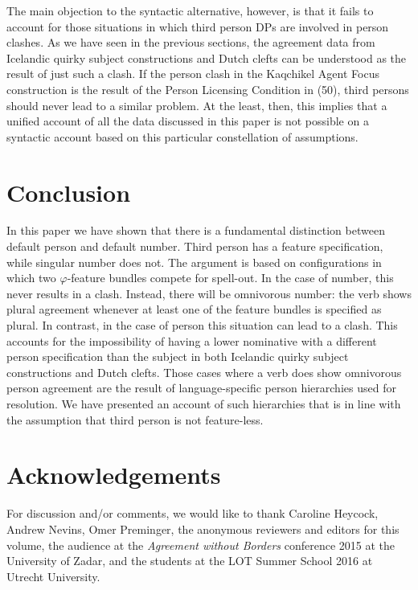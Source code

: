 \documentclass[output=paper]{langsci/langscibook}
\begin{document}
  The main objection to the syntactic alternative, however, is that it fails to account for those situations in which third person DPs are involved in person clashes. As we have seen in the previous sections, the agreement data from Icelandic quirky subject constructions and Dutch clefts can be understood as the result of just such a clash. If the person clash in the Kaqchikel Agent Focus construction is the result of the Person Licensing Condition in (50), third persons should never lead to a similar problem. At the least, then, this implies that a unified account of all the data discussed in this paper is not possible on a syntactic account based on this particular constellation of assumptions.

\section{Conclusion}
In this paper we have shown that there is a fundamental distinction between default person and default number. Third person has a feature specification, while singular number does not. The argument is based on configurations in which two $\varphi $-feature bundles compete for spell-out. In the case of number, this never results in a clash. Instead, there will be omnivorous number: the verb shows plural agreement whenever at least one of the feature bundles is specified as plural. In contrast, in the case of person this situation can lead to a clash. This accounts for the impossibility of having a lower nominative with a different person specification than the subject in both Icelandic quirky subject constructions and Dutch clefts. Those cases where a verb does show omnivorous person agreement are the result of language-specific person hierarchies used for resolution. We have presented an account of such hierarchies that is in line with the assumption that third person is not feature-less. 

\section*{Acknowledgements}
For discussion and/or comments, we would like to thank Caroline Heycock, Andrew Nevins, Omer Preminger, the anonymous reviewers and editors for this volume, the audience at the \textit{Agreement without Borders} conference 2015 at the University of Zadar, and the students at the LOT Summer School 2016 at Utrecht University.
\end{document}
